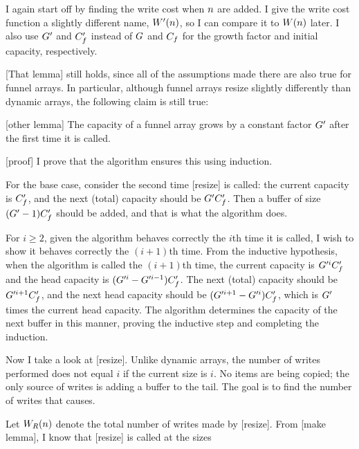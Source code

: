 \funarrayimpl

\tcomplex

I again start off by finding the write cost when $n$ are added. I give the write cost function a slightly different name, $W'(n)$, so I can compare it to $W(n)$ later. I also use $G'$ and $C_f'$ instead of $G$ and $C_f$ for the growth factor and initial capacity, respectively.

[That lemma] still holds, since all of the assumptions made there are also true for funnel arrays. In particular, although funnel arrays resize slightly differently than dynamic arrays, the following claim is still true:

[other lemma]
The capacity of a funnel array grows by a constant factor $G'$ after the first time it is called.

[proof]
I prove that the algorithm ensures this using induction.

For the base case, consider the second time [resize] is called: the current capacity is $C_f'$, and the next (total) capacity should be $G'C_f'$. Then a buffer of size $(G' - 1)C_f'$ should be added, and that is what the algorithm does.

For $i \geq 2$, given the algorithm behaves correctly the $i$th time it is called, I wish to show it behaves correctly the $(i + 1)$th time. From the inductive hypothesis, when the algorithm is called the $(i + 1)$th time, the current capacity is $G'^iC_f'$ and the head capacity is $(G'^i - G'^{i - 1})C_f'$. The next (total) capacity should be $G'^{i + 1}C_f'$, and the next head capacity should be $(G'^{i + 1} - G'^i)C_f'$, which is $G'$ times the current head capacity. The algorithm determines the capacity of the next buffer in this manner, proving the inductive step and completing the induction.

Now I take a look at [resize]. Unlike dynamic arrays, the number of writes performed does not equal $i$ if the current size is $i$. No items are being copied; the only source of writes is adding a buffer to the tail. The goal is to find the number of writes that causes.

Let $W_R(n)$ denote the total number of writes made by [resize]. From [make lemma], I know that [resize] is called at the sizes

